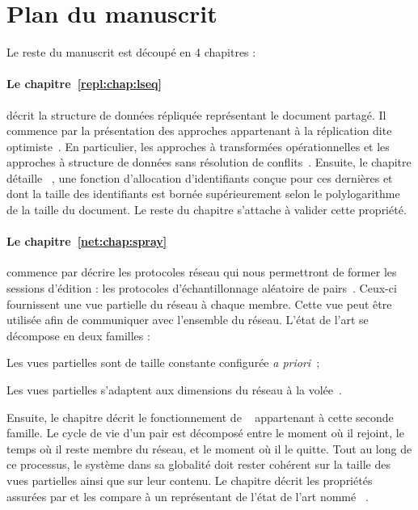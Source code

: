 
\section{Plan du manuscrit}

Le reste du manuscrit est découpé en 4 chapitres :

\paragraph{Le chapitre~\ref{repl:chap:lseq}} décrit la structure de
données répliquée représentant le document partagé. Il commence par la
présentation des approches appartenant à la réplication dite
optimiste~\cite{demers1987epidemic, saito2005optimistic}. En particulier, les
approches à transformées opérationnelles et les approches à structure de données
sans résolution de conflits~\cite{burckhardt2014replicated,
  shapiro2011conflict}. Ensuite, le chapitre détaille
\LSEQ~\cite{nedelec2013concurrency, nedelec2013lseq}, une fonction d'allocation
d'identifiants conçue pour ces dernières et dont la taille des identifiants est
bornée supérieurement selon le polylogarithme de la taille du document. Le reste
du chapitre s'attache à valider cette propriété.

\paragraph{Le chapitre~\ref{net:chap:spray}} commence par décrire les
protocoles réseau qui nous permettront de former les sessions d'édition : les
protocoles d'échantillonnage aléatoire de pairs~\cite{jelasity2004peer,
  jelasity2007gossip}. Ceux-ci fournissent une vue partielle du réseau à chaque
membre. Cette vue peut être utilisée afin de communiquer avec l'ensemble du
réseau. L'état de l'art se décompose en deux familles :
\begin{inparaenum}[(i)]
\item Les vues partielles sont de taille constante configurée \emph{a
    priori}~\cite{eugster2003lightweight, jelasity2007gossip,
    leitao2007dependable, tolgyeski2009adaptive, voulgaris2005cyclon};
\item Les vues partielles s'adaptent aux dimensions du réseau à la
  volée~\cite{ganesh2001scamp, ganesh2003peer}.
\end{inparaenum}
Ensuite, le chapitre décrit le fonctionnement de \SPRAY~\cite{nedelec2015spray}
appartenant à cette seconde famille. Le cycle de vie d'un pair est décomposé
entre le moment où il rejoint, le temps où il reste membre du réseau, et le
moment où il le quitte. Tout au long de ce processus, le système dans sa
globalité doit rester cohérent sur la taille des vues partielles ainsi que sur
leur contenu.  Le chapitre décrit les propriétés assurées par \SPRAY et les
compare à un représentant de l'état de l'art nommé
\CYCLON~\cite{voulgaris2005cyclon}.

